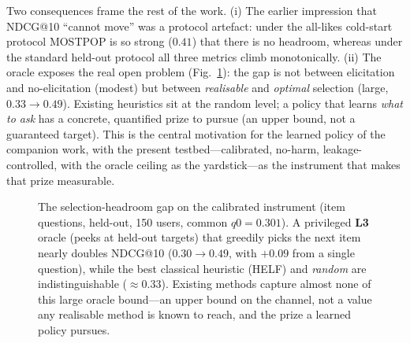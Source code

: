 \documentclass[11pt]{article}
\begin{document}
Two consequences frame the rest of the work. (i) The earlier impression that NDCG@10 ``cannot move'' was a protocol
artefact: under the all-likes cold-start protocol MOSTPOP is so strong ($0.41$) that there is no headroom, whereas
under the standard held-out protocol all three metrics climb monotonically. (ii) The oracle exposes the real open
problem (Fig.~\ref{fig:headroom}): the gap is not between elicitation and no-elicitation (modest) but between
\emph{realisable} and \emph{optimal} selection (large, $0.33\!\to\!0.49$). Existing heuristics sit at the random level; a policy that learns
\emph{what to ask} has a concrete, quantified prize to pursue (an upper bound, not a guaranteed target). This is the central motivation for the learned policy
of the companion work, with the present testbed---calibrated, no-harm, leakage-controlled, with the oracle ceiling as
the yardstick---as the instrument that makes that prize measurable.

\begin{figure}[h]\centering
{}
\caption{The selection-headroom gap on the calibrated instrument (item questions, held-out, 150 users, common
$q0=0.301$). A privileged \textbf{L3} oracle (peeks at held-out targets) that greedily picks the next item nearly
doubles NDCG@10 ($0.30\!\to\!0.49$, with
$+0.09$ from a single question), while the best classical heuristic (HELF) and \emph{random} are indistinguishable
($\approx0.33$). Existing methods capture almost none of this large oracle bound---an upper bound on the channel, not a
value any realisable method is known to reach, and the prize a learned policy pursues.}
\label{fig:headroom}
\end{figure}
\end{document}
